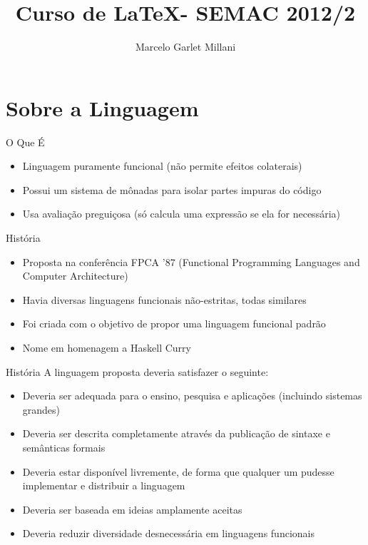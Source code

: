 \documentclass{beamer}
\title{Curso de \LaTeX - SEMAC 2012/2}
\author[M. Millani]{Marcelo Garlet Millani}
\institute[II/UFRGS]{Universidade Federal do Rio Grande do Sul \\ Instituto de Informática \\ Grupo PET Computação}
\begin{document}
	\begin{frame}
		\maketitle
	\end{frame}

\section{Sobre a Linguagem}
	\begin{frame}{O Que É}
		\begin{itemize}
		 \item Linguagem puramente funcional (não permite efeitos colaterais)
		 \item Possui um sistema de mônadas para isolar partes impuras do código
		 \item Usa avaliação preguiçosa (só calcula uma expressão se ela for necessária)
		\end{itemize}
	\end{frame}
	
	\begin{frame}{História}
	 
	 \begin{itemize}
	  \item Proposta na conferência FPCA '87 (Functional Programming Languages and Computer Architecture)
	  \item Havia diversas linguagens funcionais não-estritas, todas similares
	  \item Foi criada com o objetivo de propor uma linguagem funcional padrão
	  \item Nome em homenagem a Haskell Curry
	 \end{itemize}
	\end{frame}
	
	\begin{frame}{História}
	 A linguagem proposta deveria satisfazer o seguinte:
	 \begin{itemize}
	  \item Deveria ser adequada para o ensino, pesquisa e aplicações (incluindo sistemas grandes)
	  \item Deveria ser descrita completamente através da publicação de sintaxe e semânticas formais
	  \item Deveria estar disponível livremente, de forma que qualquer um pudesse implementar e distribuir a linguagem
	  \item Deveria ser baseada em ideias amplamente aceitas
	  \item Deveria reduzir diversidade desnecessária em linguagens funcionais
	 \end{itemize}
	\end{frame}
	
\end{document}
